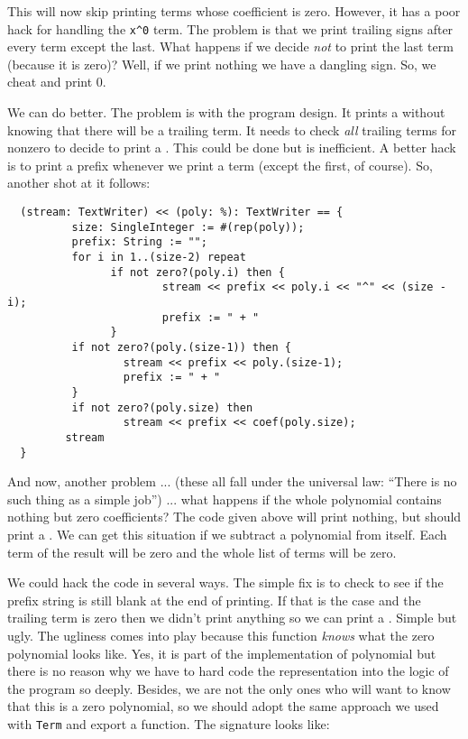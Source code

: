 This will now skip printing terms whose coefficient is zero. However,
it has a poor hack for handling the \verb+x^0+ term. The problem is that
we print trailing \ttin{+} signs after every term except the last. What happens
if we decide {\em not\/} to print the last term (because it is zero)? Well, if
we print nothing we have a dangling \ttin{+} sign. So, we cheat and print 0.

We can do better. The problem is with the program design. It prints a 
\ttin{+} without knowing that there will be a trailing term. It needs to 
check {\em all} trailing terms for nonzero to decide to print a \ttin{+}. This 
could be done but is inefficient. A better hack is to print a prefix
\ttin{+} whenever we print a term (except the first, of course). So, another
shot at it follows:
     
\begin{small}
\begin{verbatim}
  (stream: TextWriter) << (poly: %): TextWriter == {
          size: SingleInteger := #(rep(poly));
          prefix: String := "";
          for i in 1..(size-2) repeat
                if not zero?(poly.i) then {
                        stream << prefix << poly.i << "^" << (size - i);
                        prefix := " + "
                }
          if not zero?(poly.(size-1)) then {
                  stream << prefix << poly.(size-1);
                  prefix := " + "
          }
          if not zero?(poly.size) then 
                  stream << prefix << coef(poly.size);
         stream
  }
\end{verbatim}
\end{small}

And now, another problem ... (these all fall under the universal law:
``There is no such thing as a simple job'') ... what happens if the whole
polynomial contains nothing but zero coefficients? The code given
above will print nothing, but should print a . We can get this
situation if we subtract a polynomial from itself. Each term of the
result will be zero and the whole list of terms will be zero. 

We could hack the code in several ways. The simple fix is to check to
see if the prefix string is still blank at the end of printing.  If
that is the case and the trailing term is zero then we didn't print
anything so we can print a . Simple but ugly. The ugliness
comes into play because this function {\em knows} what the zero
polynomial looks like. Yes, it is part of the implementation of
polynomial but there is no reason why we have to hard code the
representation into the logic of the program so deeply. Besides, we
are not the only ones who will want to know that this is a zero
polynomial, so we should adopt the same
approach we used with \verb"Term" and
export a  function.  The signature looks like:

